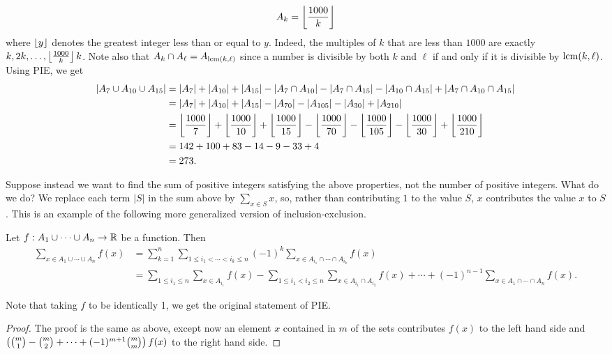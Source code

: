 \[
A_k=\left\lfloor {\frac {1000}k}\right\rfloor
\] 
where $\left\lfloor {y}\right\rfloor$ denotes the greatest integer less than or equal to $y$. Indeed, the multiples of $k$ that are less than $1000$ are exactly $k, 2k,\ldots, \left\lfloor {\frac{1000}{k}}\right\rfloor k$. Note also that $A_k\cap A_{\ell}=A_{\operatorname{lcm}(k,\ell)}$ since a number is divisible by both $k$ and $\ell$ if and only if it is divisible by $\operatorname{lcm}(k,\ell)$. Using PIE, we get
\begin{align*}
|A_7\cup A_{10}\cup A_{15}|&=|A_7|+|A_{10}|+|A_{15}|-|A_7\cap A_{10}|-|A_7\cap A_{15}|-|A_{10}\cap A_{15}|+|A_{7}\cap A_{10}\cap A_{15}|\\
&=|A_7|+|A_{10}|+|A_{15}|-|A_{70}|-|A_{105}|-|A_{30}|+|A_{210}|\\
&=\left\lfloor {\frac{1000}{7}}\right\rfloor+\left\lfloor {\frac{1000}{10}}\right\rfloor+\left\lfloor {\frac{1000}{15}}\right\rfloor-\left\lfloor {\frac{1000}{70}}\right\rfloor-\left\lfloor {\frac{1000}{105}}\right\rfloor-\left\lfloor {\frac{1000}{30}}\right\rfloor+\left\lfloor {\frac{1000}{210}}\right\rfloor\\
&=142+100+83-14-9-33+4\\
&=273.
\end{align*}

Suppose instead we want to find the sum of positive integers satisfying the above properties, not the number of positive integers. What do we do? We replace each term $|S|$ in the sum above by $\sum_{x\in S} x$, so, rather than contributing $1$ to the value $S$, $x$ contributes the value $x$ to $S$. This is an example of the following more generalized version of inclusion-exclusion.
\begin{thm}
Let $f:A_1\cup \cdots \cup A_n\to \mathbb{R}$ be a function. Then
\begin{align*}
\sum_{x\in A_1\cup \cdots \cup A_n} f(x)&=\sum_{k=1}^n \sum_{1\le i_1< \cdots < i_k\le n}(-1)^{k} \sum_{x\in A_{i_1}\cap \cdots \cap A_{i_k}}f(x)\\
&=\sum_{1\le i_1\le n}\sum_{x\in A_{i_1}}f(x)-\sum_{1\le i_1<i_2\le n}\sum_{x\in A_{i_1}\cap A_{i_2}}f(x)+\cdots+(-1)^{n-1}\sum_{x\in A_1\cap \cdots \cap A_n} f(x).
\end{align*}
\end{thm}
Note that taking $f$ to be identically 1, we get the original statement of PIE.
\begin{proof}
The proof is the same as above, except now an element $x$ contained in $m$ of the sets contributes $f(x)$ to the left hand side and $\left( {\binom m1-\binom m2+\cdots +(-1)^{m+1}\binom mm} \right)f(x)$ to the right hand side.
\end{proof}
